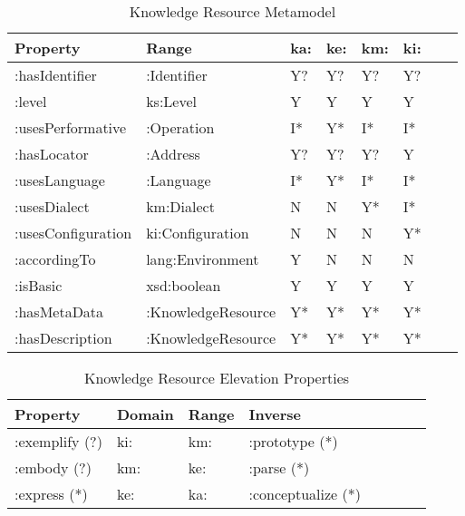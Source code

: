 \documentclass[runningheads]{llncs}
\begin{document}
\begin{table}[h]
\begin{tabular}{|l|l|l|l|l|l|l|l|}
\hline
\textbf{Property}  & \textbf{Range}
& \textbf{ka:}
& \textbf{ke:}
& \textbf{km:}
& \textbf{ki:}
\\ \hline
:hasIdentifier      & :Identifier        & Y?                & Y?                     & Y?             & Y?               \\ \hline
:level              & ks:Level           & Y                 & Y                      & Y              & Y                \\ \hline
:usesPerformative   & :Operation      & I*                & Y*                     & I*              & I*                \\ \hline
:hasLocator         & :Address           & Y?                & Y?                     & Y?             & Y                \\ \hline
:usesLanguage       & :Language       & I*                & Y*                     & I*             & I*               \\ \hline
:usesDialect        & km:Dialect        & N                 & N                      & Y*             & I*               \\ \hline
:usesConfiguration  & ki:Configuration   & N                 & N                      & N            & Y*               \\ \hline
:accordingTo        & lang:Environment     & Y                 & N                      & N              & N                \\ \hline
:isBasic            & xsd:boolean        & Y                 & Y                      & Y              & Y                \\ \hline
:hasMetaData        & :KnowledgeResource & Y*                & Y*                     & Y*             & Y*               \\ \hline
:hasDescription   & :KnowledgeResource       & Y*                & Y*                     & Y*             & Y*   \\ \hline
\end{tabular}
\caption{Knowledge Resource Metamodel}
\label{kronto}
\end{table}

\begin{table}[h]
\begin{tabular}{|l|l|l|l|l|l|l|l|}
\hline
\textbf{Property}  &\textbf{Domain}  & \textbf{Range}  & \textbf{Inverse}
\\ \hline
:exemplify (?)   & ki:        & km:     & :prototype (*)         \\ \hline
:embody (?)      & km:        & ke:     & :parse (*)             \\ \hline
:express (*)     & ke:        & ka:     & :conceptualize (*)     \\ \hline
\end{tabular}
\caption{Knowledge Resource Elevation Properties}
\label{krelevationprop}
\end{table}
\end{document}
